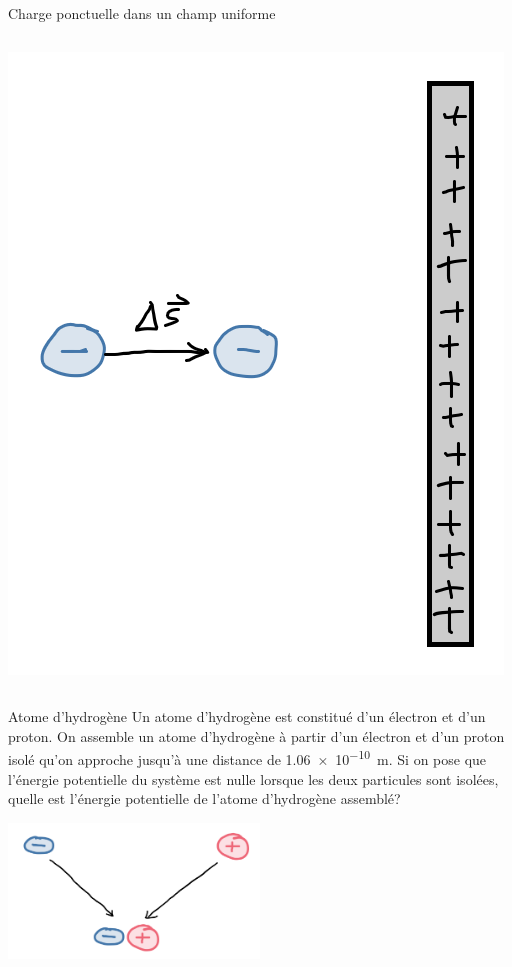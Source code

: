 \documentclass{beamer}
\begin{document}
\begin{frame}[t]{Charge ponctuelle dans un champ uniforme}
\begin{columns}[t]
    \begin{center}
      \includegraphics[width=\textwidth]{figures/charge_neg_gauche_plaque.png}
    \end{center}
  \end{columns}
\end{frame}



\begin{frame}[t]{Atome d'hydrogène}
  Un atome d'hydrogène est constitué d'un électron et d'un proton. On
  assemble un atome d'hydrogène à partir d'un électron et d'un proton isolé
  qu'on approche jusqu'à une distance de \SI{1.06e-10}{\meter}. Si on pose que
  l'énergie potentielle du système est nulle lorsque les deux particules sont
  isolées, quelle est l'énergie potentielle de l'atome d'hydrogène assemblé?
  \begin{center}
    \includegraphics[width=0.5\textwidth]{figures/hydrogene.png}
  \end{center}
\end{frame}
\end{document}
